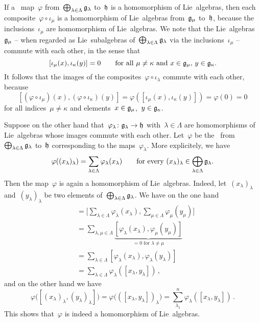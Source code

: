 \begin{example}
  If a~\linear{$\kf$} map~$\varphi$ from~$\bigoplus_{\lambda \in \Lambda} \mathfrak{g}_\lambda$ to~$\mathfrak{h}$ is a homomorphism of Lie~algebras, then each composite~$\varphi \circ \iota_\mu$ is a homomorphism of Lie~algebras from~$\mathfrak{g}_\mu$ to~$\mathfrak{h}$, because the inclusions~$\iota_\mu$ are homomorphism of Lie~algebras.
  We note that the Lie~algebras~$\mathfrak{g}_\mu$ -- when regarded as Lie~subalgebras of~$\bigoplus_{\lambda \in \Lambda} \mathfrak{g}_\lambda$ via the inclusions~$\iota_\mu$ -- commute with each other, in the sense that
  \[
    [ \iota_\mu(x), \iota_\kappa(y) ] = 0
    \qquad
    \text{for all~$\mu \neq \kappa$ and~$x \in \mathfrak{g}_\mu$,~$y \in \mathfrak{g}_\kappa$.}
  \]
  It follows that the images of the composites~$\varphi \circ \iota_\lambda$ commute with each other, because
  \[
    [
      (\varphi \circ \iota_\mu)(x),
      (\varphi \circ \iota_\kappa)(y)
    ]
    =
    \varphi( [\iota_\mu(x), \iota_\kappa(y)] )
    =
    \varphi(0)
    =
    0
  \]
  for all indices~$\mu \neq \kappa$ and elements~$x \in \mathfrak{g}_\mu$,~$y \in \mathfrak{g}_\kappa$.

  Suppose on the other hand that~$\varphi_\lambda \colon \glie_\lambda \to \hlie$ with~$\lambda \in \Lambda$ are homomorphisms of Lie~algebras whose images commute with each other.
  Let~$\varphi$ be the~\linear{$\kf$} from~$\bigoplus_{\lambda \in \Lambda} \mathfrak{g}_\lambda$ to~$\mathfrak{h}$ corresponding to the maps~$\varphi_\lambda$.
  More explicitely, we have
  \[
    \varphi( (x_\lambda)_\lambda )
    =
    \sum_{\lambda \in \Lambda}
    \varphi_\lambda(x_\lambda)
    \qquad
    \text{for every~$(x_\lambda)_\lambda \in \bigoplus_{\lambda \in \Lambda} \mathfrak{g}_\lambda$.}
  \]
  Then the map~$\varphi$ is again a homomorphism of Lie~algebras.
  Indeed, let~$(x_\lambda)_\lambda$ and~$(y_\lambda)_\lambda$ be two elements of~$\bigoplus_{\lambda \in \Lambda} \mathfrak{g}_\lambda$.
  We have on the one hand
  \begin{align*}
    [
      \varphi( (x_\lambda)_\lambda ),
      \varphi( (y_\lambda)_\lambda )
    ]
    &=
    \Biggl[
      \sum_{\lambda \in \Lambda}
      \varphi_\lambda( x_\lambda ) ,
      \sum_{\mu \in \Lambda}
      \varphi_\mu( y_\mu )
    \Biggr]
    \\
    &=
    \sum_{\lambda, \mu \in \Lambda}
    \underbrace{
      [ \varphi_\lambda( x_\lambda ) , \varphi_\mu( y_\mu ) ]
    }_{
      \text{$= 0$ for~$\lambda \neq \mu$}
    }
    \\
    &=
    \sum_{\lambda \in \Lambda} [ \varphi_\lambda( x_\lambda ), \varphi_\lambda( y_\lambda ) ]
    \\
    &=
    \sum_{\lambda \in \Lambda} \varphi_\lambda( [ x_\lambda , y_\lambda ] ) \,,
  \end{align*}
  and on the other hand we have
  \[
    \varphi\bigl( [ (x_\lambda)_\lambda, (y_\lambda)_\lambda ] \bigr)
    =
    \varphi\bigl( ( [x_\lambda, y_\lambda] )_\lambda \bigr)
    =
    \sum_{\lambda_1}^n \varphi_\lambda( [ x_\lambda, y_\lambda ] ) \,.
  \]
  This shows that~$\varphi$ is indeed a homomorphism of Lie~algebras.


\end{example}
